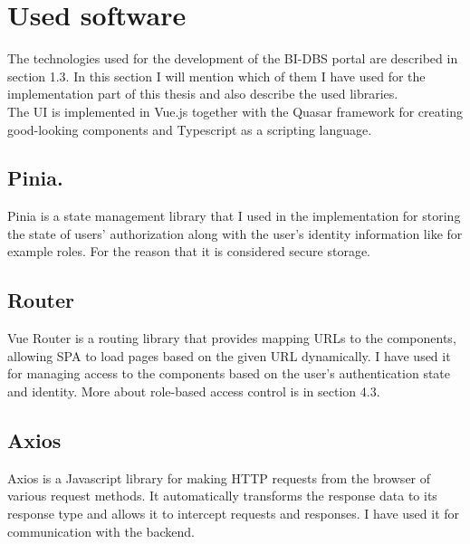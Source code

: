 \section{Used software} The technologies used for the development of the BI-DBS portal are described in section 1.3. In this section I will mention which of them I have used for the implementation part of this thesis and also describe the used libraries.\\
The UI is implemented in Vue.js \cite{vue-docs} together with the Quasar framework \cite{quasar-doc} for creating good-looking components and Typescript \cite{typescript-doc} as a scripting language. 

\subsection{Pinia.} Pinia is a state management library that I used in the implementation for storing the state of users' authorization along with the user's identity information like for example roles. For the reason that it is considered secure storage. \cite{pinia-docs}

\subsection{Router} Vue Router is a routing library that provides mapping URLs to the components, allowing SPA to load pages based on the given URL dynamically. I have used it for managing access to the components based on the user's authentication state and identity. More about role-based access control is in section 4.3. \cite{router-doc}

\subsection{Axios} Axios is a Javascript library for making HTTP requests from the browser of various request methods. It automatically transforms the response data to its response type and allows it to intercept requests and responses. I have used it for communication with the backend. \cite{axios-docs}

